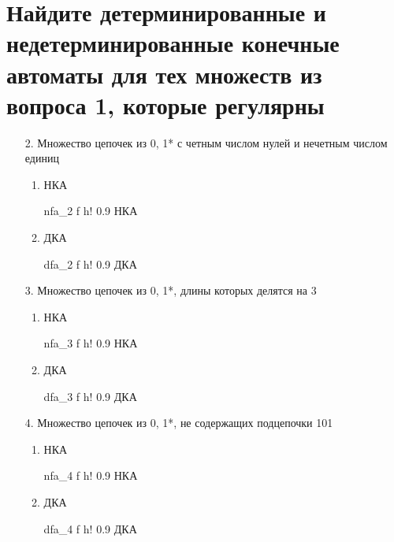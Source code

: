 \section{Найдите детерминированные и недетерминированные конечные автоматы для тех множеств из вопроса 1, которые регулярны}

\begin{enumerate}
	\item[2.] Множество цепочек из {0, 1}* с четным числом нулей и нечетным числом единиц
	
	\begin{enumerate}
		\item НКА
		
    	{nfa_2}
    	{f}
    	{h!}
    	{0.9\textwidth}
    	{НКА}
		
		\item ДКА
		
    	{dfa_2}
    	{f}
    	{h!}
    	{0.9\textwidth}
    	{ДКА}
		
	\end{enumerate}
	
	\item[3.] Множество цепочек из {0, 1}*, длины которых делятся на 3
	
	\begin{enumerate}
		\item НКА
		
    	{nfa_3}
    	{f}
    	{h!}
    	{0.9\textwidth}
    	{НКА}
		
		\item ДКА
		
    	{dfa_3}
    	{f}
    	{h!}
    	{0.9\textwidth}
    	{ДКА}
		
	\end{enumerate}
	
	\item[4.] Множество цепочек из {0, 1}*, не содержащих подцепочки 101
	
	\begin{enumerate}
		\item НКА
		
    	{nfa_4}
    	{f}
    	{h!}
    	{0.9\textwidth}
    	{НКА}
		
		\item ДКА
		
    	{dfa_4}
    	{f}
    	{h!}
    	{0.9\textwidth}
    	{ДКА}
		
	\end{enumerate}
	
\end{enumerate}

